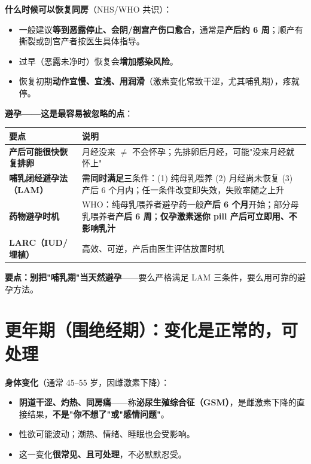 \documentclass[12pt,UTF8,openany]{ctexbook}
\begin{document}
\textbf{什么时候可以恢复同房}（NHS/WHO 共识）：

\begin{itemize}[leftmargin=2em,itemsep=0.3em]
  \item 一般建议\textbf{等到恶露停止、会阴/剖宫产伤口愈合}，通常是\textbf{产后约 6 周}；顺产有撕裂或剖宫产者按医生具体指导。
  \item 过早（恶露未净时）恢复会\textbf{增加感染风险}。
  \item 恢复初期\textbf{动作宜慢、宜浅、用润滑}（激素变化常致干涩，尤其哺乳期），疼就停。
\end{itemize}

\textbf{避孕——这是最容易被忽略的点}：

\begin{tabularx}{\linewidth}{X X}
\toprule
\textbf{要点} & \textbf{说明} \\
\midrule
\textbf{产后可能很快恢复排卵} & 月经没来 $\ne$ 不会怀孕；先排卵后月经，可能"没来月经就怀上" \\
\textbf{哺乳闭经避孕法（LAM）} & 需\textbf{同时满足}三条件：(1) 纯母乳喂养 (2) 月经尚未恢复 (3) 产后 6 个月内；任一条件改变即失效，失败率随之上升 \\
\textbf{药物避孕时机} & WHO：纯母乳喂养者避孕药一般\textbf{产后 6 个月}开始；部分母乳喂养者\textbf{产后 6 周}；\textbf{仅孕激素迷你 pill 产后可立即用、不影响乳汁} \\
\textbf{LARC（IUD/埋植）} & 高效、可逆，产后由医生评估放置时机 \\
\bottomrule
\end{tabularx}

\vspace{0.5em}
\noindent\textbf{要点：}\textbf{别把"哺乳期"当天然避孕}——要么严格满足 LAM 三条件，要么用可靠的避孕方法。

\section{更年期（围绝经期）：变化是正常的，可处理}

\textbf{身体变化}（通常 45--55 岁，因雌激素下降）：

\begin{itemize}[leftmargin=2em,itemsep=0.3em]
  \item \textbf{阴道干涩、灼热、同房痛}——称\textbf{泌尿生殖综合征（GSM）}，是雌激素下降的直接结果，\textbf{不是"你不想了"或"感情问题"}。
  \item 性欲可能波动；潮热、情绪、睡眠也会受影响。
  \item 这一变化\textbf{很常见、且可处理}，不必默默忍受。
\end{itemize}
\end{document}
